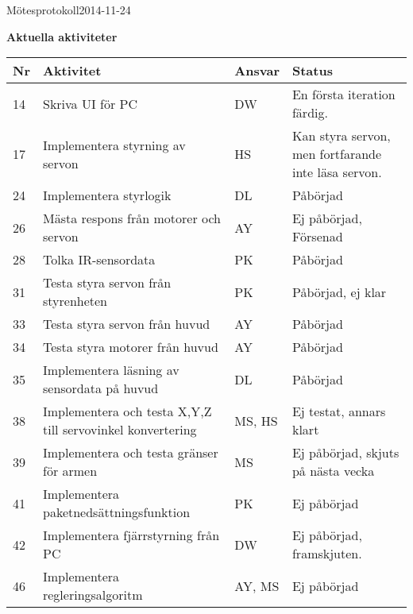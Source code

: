 \documentclass[titlepage, a4paper]{article}
\begin{document}
\begin{projektmote}{Mötesprotokoll}{2014-11-24}
\end{projektmote}

\newpage
\textbf{\Large Aktuella aktiviteter}
\begin{center}
\begin{tabularx}{\textwidth}{| p{4mm} | X | p{13.5mm} | X |}
	\hline
	\textbf{Nr} & \textbf{Aktivitet} & \textbf{Ansvar} & \textbf{Status} \\\hline	
	{14} & {Skriva UI för PC} & {DW} & {En första iteration färdig.} \\\hline
	{17} & {Implementera styrning av servon} & {HS} & {Kan styra servon, men fortfarande inte läsa servon.} \\\hline
	{24} & {Implementera styrlogik} & {DL} & {Påbörjad} \\\hline
	{26} & {Mästa respons från motorer och servon} & {AY} & {Ej påbörjad, Försenad} \\\hline
	{28} & {Tolka IR-sensordata} & {PK} & {Påbörjad} \\\hline
	{31} & {Testa styra servon från styrenheten} & {PK} & {Påbörjad, ej klar} \\\hline
	{33} & {Testa styra servon från huvud} & {AY} & {Påbörjad} \\\hline
	{34} & {Testa styra motorer från huvud} & {AY} & {Påbörjad} \\\hline
	{35} & {Implementera läsning av sensordata på huvud} & {DL} & {Påbörjad} \\\hline
	{38} & {Implementera och testa X,Y,Z  till servovinkel konvertering} & {MS, HS} & {Ej testat, annars klart} \\\hline
	{39} & {Implementera och testa gränser för armen} & {MS} & {Ej påbörjad, skjuts på nästa vecka} \\\hline
	{41} & {Implementera paketnedsättningsfunktion} & {PK} & {Ej påbörjad} \\\hline
	{42} & {Implementera fjärrstyrning från PC} & {DW} & {Ej påbörjad, framskjuten.} \\\hline
	{46} & {Implementera regleringsalgoritm} & {AY, MS} & {Ej påbörjad} \\\hline
\end{tabularx}
\end{center}
\end{document}
